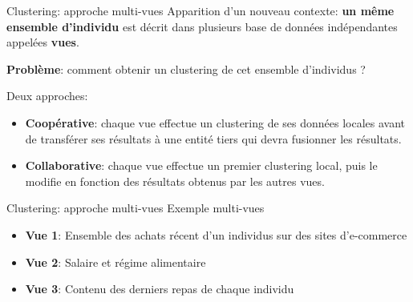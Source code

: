 \documentclass[hyperref={pdfpagelabels=false}]{beamer}
\begin{document}
    \begin{frame}{Clustering: approche multi-vues}
        Apparition d'un nouveau contexte: \textbf{un même ensemble d'individu} 
        est décrit dans plusieurs base de données indépendantes appelées 
        \textbf{vues}.

        \textbf{Problème}: comment obtenir un clustering de cet ensemble 
        d'individus ?

        Deux approches:
        \begin{itemize}
            \item<2-> {\textbf{Coopérative}: chaque 
                vue effectue un clustering de ses données locales avant de 
            transférer ses résultats à une entité tiers qui devra fusionner les 
        résultats.}
            \item<3-> \textbf{Collaborative}: chaque vue effectue un premier 
                clustering local, puis le modifie en fonction des résultats 
                obtenus par les autres vues.
        \end{itemize}
    \end{frame}

    \begin{frame}{Clustering: approche multi-vues}
        Exemple multi-vues
        \begin{itemize}
            \item \textbf{Vue 1}: Ensemble des achats récent d'un individus 
                sur des sites d'e-commerce
            \item \textbf{Vue 2}: Salaire et régime alimentaire
            \item \textbf{Vue 3}: Contenu des derniers repas de chaque 
                individu
        \end{itemize}
    \end{frame}
\end{document}
